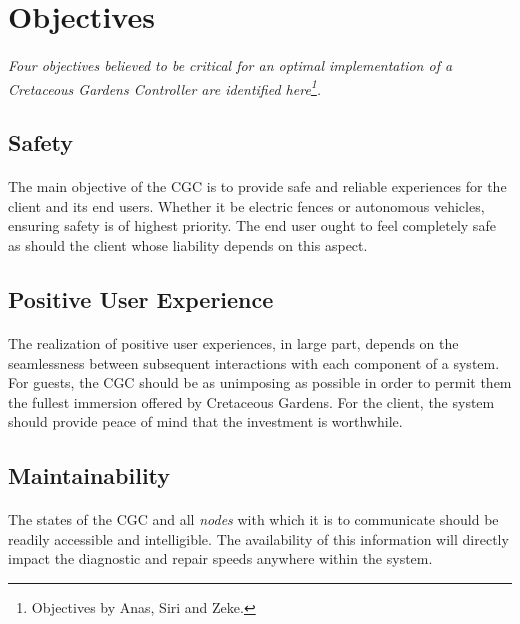 \documentclass[12pt]{article}
\begin{document}
\section{Objectives}
\label{obj}
\paragraph{} \textit{Four objectives believed to be critical for an 
optimal implementation of a \textit{Cretaceous Gardens Controller} are identified 
here\footnote{Objectives by Anas, Siri and Zeke.}.}
 
    \subsection{Safety}\label{saf}
    \paragraph{} The main objective of the CGC is to provide safe and reliable 
    experiences for the client and its end users. Whether it be electric fences 
    or autonomous vehicles, ensuring safety is of highest priority. The end user
    ought to feel completely safe as should the client whose liability depends on
    this aspect.

    \subsection{Positive User Experience}\label{use}
    \paragraph{} The realization of positive user experiences, in large part, 
    depends on the seamlessness between subsequent interactions with each component
    of a system. For guests, the CGC should be as unimposing as possible in order
    to permit them the fullest immersion offered by Cretaceous Gardens. For the client,
    the system should provide peace of mind that the investment is worthwhile.

    \subsection{Maintainability}\label{mai}
    \paragraph{} The states of the CGC and all \textit{nodes} with which it is to
    communicate should be readily accessible and intelligible. The availability  
    of this information will directly impact the diagnostic and repair speeds 
    anywhere within the system.
    
\end{document}
